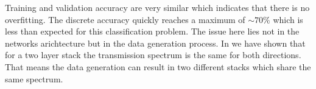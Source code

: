 Training and validation accuracy are very similar which indicates that there is no overfitting. The discrete accuracy quickly reaches a maximum of $\sim 70\%$
which is less than expected for this classification problem. The issue here lies not in the networks arichtecture but in the data generation process. In 
we have shown that for a two layer stack the transmission spectrum is the same for both directions. That means the data generation can result in two different stacks which share the same spectrum.
